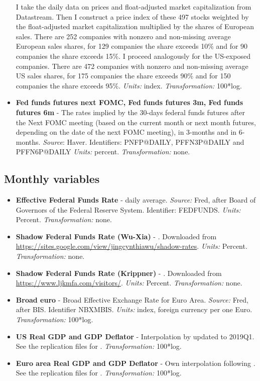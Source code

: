 \documentclass[a4paper,12pt]{article}
\begin{document}
\begin{itemize}
I take the daily data on prices and float-adjusted market capitalization from Datastream.
Then I construct a price index of these 497 stocks weighted by the float-adjusted market capitalization multiplied by the shares of European sales.
There are 252 companies with nonzero and non-missing average European sales shares, for 129 companies the share exceeds 10\% and for 90 companies the share exceeds 15\%.
I proceed analogously for the US-exposed companies.
There are 472 companies with nonzero and non-missing average US sales shares, for 175 companies the share exceeds 90\% and for 150 companies the share exceeds 95\%.
\emph{Units:} index. \emph{Transformation:} 100*log.
\item
\textbf{Fed funds futures next FOMC, Fed funds futures 3m, Fed funds futures 6m} - The rates implied by the 30-days federal funds futures after the Next FOMC meeting (based on the current month or next month futures, depending on the date of the next FOMC meeting), in 3-months and in 6-months. \emph{Source}: Haver. Identifiers: PNFP@DAILY, PFFN3P@DAILY and PFFN6P@DAILY \emph{Units:} percent. \emph{Transformation:} none.

\end{itemize}

\subsection{Monthly variables}

\begin{itemize}
\item
\textbf{Effective Federal Funds Rate} - daily average. \emph{Source:} Fred, after Board of Governors of the Federal Reserve System. Identifier: FEDFUNDS. \emph{Units:} Percent. \emph{Transformation:} none.
\item
\textbf{Shadow Federal Funds Rate (Wu-Xia)} - \cite{Wu_Xia_2016}. Downloaded
from \url{https://sites.google.com/view/jingcynthiawu/shadow-rates}.
\emph{Units:} Percent. \emph{Transformation:} none.
\item 
\textbf{Shadow Federal Funds Rate (Krippner)} - \cite{Krippner_2013,Krippner_2015}. Downloaded
from \url{https://www.ljkmfa.com/visitors/}.
\emph{Units:} Percent. \emph{Transformation:} none.
\item
\textbf{Broad euro} - Broad Effective Exchange Rate for Euro Area. \emph{Source:} Fred, after BIS.  Identifier NBXMBIS. \emph{Units:} index, foreign currency per one Euro. \emph{Transformation:} 100*log.
\item
\textbf{US Real GDP and GDP Deflator} - Interpolation by
\cite{Stock_Watson_2010} updated to 2019Q1. See the replication files for \cite{Jarocinski_Karadi_2020}. \emph{Transformation:} 100*log.
\item
\textbf{Euro area Real GDP and GDP Deflator} - Own interpolation following
\cite{Stock_Watson_2010}. See the replication files for \cite{Jarocinski_Karadi_2020}. \emph{Transformation:} 100*log.
\end{itemize}
\end{document}
